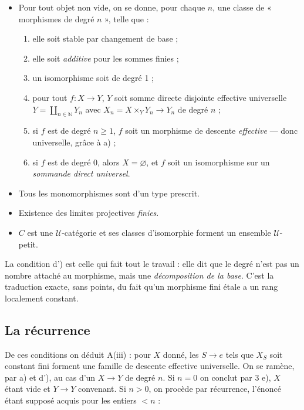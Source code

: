 \documentclass[11pt,a4paper]{article}
\begin{document}
\begin{itemize}
\item[\textbf{(3)}] Pour tout objet non vide, on se donne, pour chaque $n$, une
  classe de « morphismes de degré $n$ », telle que :
  \begin{enumerate}
    \item[a)] elle soit stable par changement de base ;
    \item[b)] elle soit \emph{additive} pour les sommes finies ;
    \item[c)] un isomorphisme soit de degré 1 ;
    \item[d')] pour tout $f : X \to Y$, $Y$ soit somme directe disjointe
      effective universelle $Y = \coprod_{n \in \mathbb{N}} Y_{n}$ avec
      $X_{n} = X \times_{Y} Y_{n} \to Y_{n}$ de degré $n$ ;
    \item[d)] si $f$ est de degré $n \geqslant 1$, $f$ soit un morphisme de
      descente \emph{effective} --- donc universelle, grâce à a) ;
    \item[e)] si $f$ est de degré $0$, alors $X = \varnothing$, et $f$ soit un
      isomorphisme sur un \emph{sommande direct universel}.
  \end{enumerate}
\item[\textbf{(2)}] Tous les monomorphismes sont d'un type prescrit.
\item[\textbf{(1)}] Existence des limites projectives \emph{finies}.
\item[\textbf{(0)}] $C$ est une $\mathcal{U}$-catégorie et ses classes
  d'isomorphie forment un ensemble $\mathcal{U}$-petit.
\end{itemize}

La condition d') est celle qui fait tout le travail : elle dit que le degré
n'est pas un nombre attaché au morphisme, mais une \emph{décomposition de la
base}. C'est la traduction exacte, sans points, du fait qu'un morphisme fini
étale a un rang localement constant.

\subsection*{La récurrence}

De ces conditions on déduit A(iii) : pour $X$ donné, les $S \to e$ tels que
$X_{S}$ soit constant fini forment une famille de descente effective
universelle. On se ramène, par a) et d'), au cas d'un $X \to Y$ de degré $n$.
Si $n = 0$ on conclut par 3 e), $X$ étant vide et $Y \to Y$ convenant. Si
$n > 0$, on procède par récurrence, l'énoncé étant supposé acquis pour les
entiers $< n$ :
\end{document}
